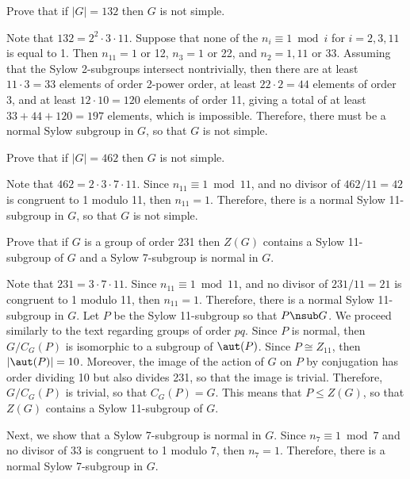 \begin{exercise}\label{ex4.5.22}
	Prove that if $|G| = 132$ then $G$ is not simple.
\end{exercise}

\begin{sol}
	Note that $132 = 2^2 \cdot 3 \cdot 11$. Suppose that none of the $n_i \equiv 1 \bmod i$ for $i = 2, 3, 11$ is equal to 1. Then $n_{11} = 1$ or 12, $n_3 = 1$ or 22, and $n_2 = 1, 11$ or 33. Assuming that the Sylow 2-subgroups intersect nontrivially, then there are at least $11 \cdot 3 = 33$ elements of order 2-power order, at least $22 \cdot 2 = 44$ elements of order 3, and at least $12 \cdot 10 = 120$ elements of order 11, giving a total of at least $33 + 44 + 120 = 197$ elements, which is impossible. Therefore, there must be a normal Sylow subgroup in $G$, so that $G$ is not simple.
\end{sol}

\begin{exercise}\label{ex4.5.23}
	Prove that if $|G| = 462$ then $G$ is not simple.
\end{exercise}

\begin{sol}
	Note that $462 = 2 \cdot 3 \cdot 7 \cdot 11$. Since $n_{11} \equiv 1 \bmod 11$, and no divisor of $462/11 = 42$ is congruent to 1 modulo 11, then $n_{11} = 1$. Therefore, there is a normal Sylow 11-subgroup in $G$, so that $G$ is not simple.
\end{sol}

\begin{exercise}\label{ex4.5.24}
	Prove that if $G$ is a group of order 231 then $Z(G)$ contains a Sylow 11-subgroup of $G$ and a Sylow 7-subgroup is normal in $G$.
\end{exercise}

\begin{sol}
	Note that $231 = 3 \cdot 7 \cdot 11$. Since $n_{11} \equiv 1 \bmod 11$, and no divisor of $231/11 = 21$ is congruent to 1 modulo 11, then $n_{11} = 1$. Therefore, there is a normal Sylow 11-subgroup in $G$. Let $P$ be the Sylow 11-subgroup so that $P \nsub G$. We proceed similarly to the text regarding groups of order $pq$. Since $P$ is normal, then $G/C_G(P)$ is isomorphic to a subgroup of $\aut(P)$. Since $P \cong Z_{11}$, then $|\aut(P)| = 10$. Moreover, the image of the action of $G$ on $P$ by conjugation has order dividing 10 but also divides 231, so that the image is trivial. Therefore, $G/C_G(P)$ is trivial, so that $C_G(P) = G$. This means that $P \leq Z(G)$, so that $Z(G)$ contains a Sylow 11-subgroup of $G$.

	Next, we show that a Sylow 7-subgroup is normal in $G$. Since $n_7 \equiv 1 \bmod 7$ and no divisor of 33 is congruent to 1 modulo 7, then $n_7 = 1$. Therefore, there is a normal Sylow 7-subgroup in $G$.
\end{sol}

